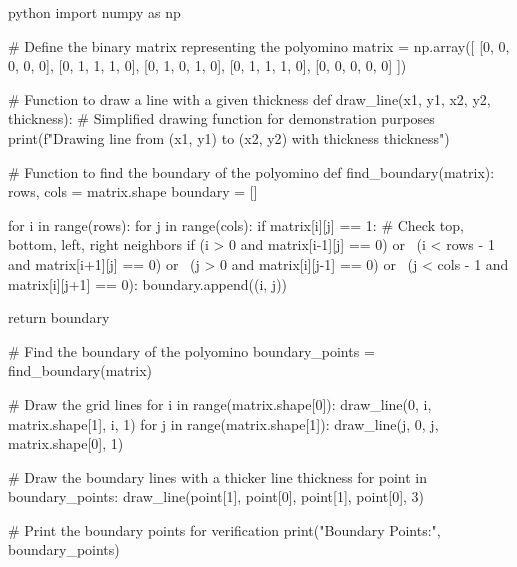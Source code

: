 python
import numpy as np

# Define the binary matrix representing the polyomino
matrix = np.array([
    [0, 0, 0, 0, 0],
    [0, 1, 1, 1, 0],
    [0, 1, 0, 1, 0],
    [0, 1, 1, 1, 0],
    [0, 0, 0, 0, 0]
])

# Function to draw a line with a given thickness
def draw_line(x1, y1, x2, y2, thickness):
    # Simplified drawing function for demonstration purposes
    print(f"Drawing line from ({x1}, {y1}) to ({x2}, {y2}) with thickness {thickness}")

# Function to find the boundary of the polyomino
def find_boundary(matrix):
    rows, cols = matrix.shape
    boundary = []
    
    for i in range(rows):
        for j in range(cols):
            if matrix[i][j] == 1:
                # Check top, bottom, left, right neighbors
                if (i > 0 and matrix[i-1][j] == 0) or \
                   (i < rows - 1 and matrix[i+1][j] == 0) or \
                   (j > 0 and matrix[i][j-1] == 0) or \
                   (j < cols - 1 and matrix[i][j+1] == 0):
                    boundary.append((i, j))
    
    return boundary

# Find the boundary of the polyomino
boundary_points = find_boundary(matrix)

# Draw the grid lines
for i in range(matrix.shape[0]):
    draw_line(0, i, matrix.shape[1], i, 1)
for j in range(matrix.shape[1]):
    draw_line(j, 0, j, matrix.shape[0], 1)

# Draw the boundary lines with a thicker line thickness
for point in boundary_points:
    draw_line(point[1], point[0], point[1], point[0], 3)

# Print the boundary points for verification
print("Boundary Points:", boundary_points)